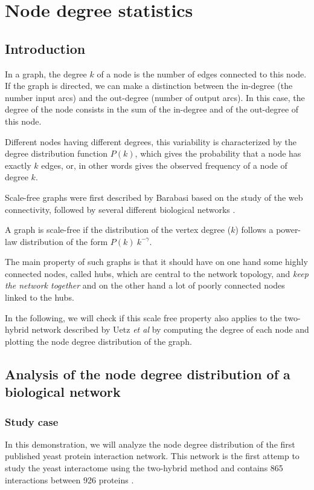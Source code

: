\chapter{Node degree statistics}

\section{Introduction}
In a graph, the degree $k$ of a node is the number of edges connected to this node.
If the graph is directed, we can make a distinction between the in-degree 
(the number input arcs) and the out-degree (number of output arcs). In this case, the degree of the 
node consists in the sum of the in-degree and of the out-degree of this node.

Different nodes having different degrees, this variability
is characterized by the degree distribution function $P(k)$,
which gives the probability that a node has exactly $k$ edges,
or, in other words gives the observed frequency of a node
of degree $k$.

Scale-free graphs were first described by Barabasi 
based on the study of the web connectivity, followed
by several different biological networks \cite{Jeong2000}.

A graph is scale-free if the distribution of the vertex degree ($k$) follows a power-law distribution of
the form $P(k) ~ k^{-\gamma}$.

The main property of such graphs is that it should have on one hand some highly connected nodes, called hubs, which are central to the network topology, and \textit{keep the network together} and on the other hand a lot of poorly connected nodes linked to the hubs.

In the following, we will check if this scale free property also applies to the two-hybrid network described by Uetz \textit{et al} \cite{Uetz:2000} by computing the degree of each node and plotting the node degree distribution of the graph.
\section{Analysis of the node degree distribution of a biological network}
\subsection{Study case}

In this demonstration, we will analyze the node degree distribution of 
the first published yeast protein interaction network. This network is the first
attemp to study the yeast interactome using the two-hybrid method  and contains 865 interactions between 926
proteins \cite{Uetz:2000}.


